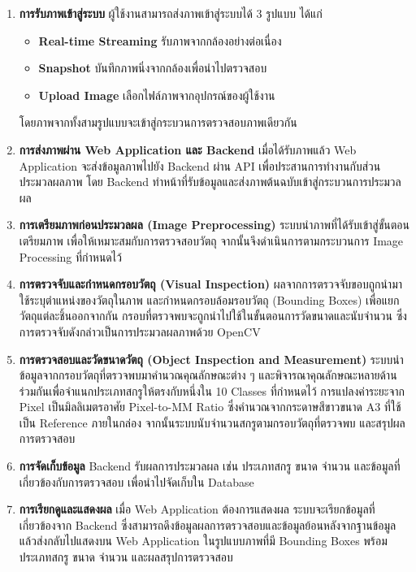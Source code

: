 \begin{enumerate}
    \item \textbf{การรับภาพเข้าสู่ระบบ} 
    ผู้ใช้งานสามารถส่งภาพเข้าสู่ระบบได้ 3 รูปแบบ ได้แก่ 
    \begin{itemize}
      \item \textbf{Real-time Streaming} รับภาพจากกล้องอย่างต่อเนื่อง
      \item \textbf{Snapshot} บันทึกภาพนิ่งจากกล้องเพื่อนำไปตรวจสอบ
      \item \textbf{Upload Image} เลือกไฟล์ภาพจากอุปกรณ์ของผู้ใช้งาน
    \end{itemize}
    โดยภาพจากทั้งสามรูปแบบจะเข้าสู่กระบวนการตรวจสอบภาพเดียวกัน

    \item \textbf{การส่งภาพผ่าน Web Application และ Backend} เมื่อได้รับภาพแล้ว Web Application จะส่งข้อมูลภาพไปยัง Backend ผ่าน API เพื่อประสานการทำงานกับส่วนประมวลผลภาพ โดย Backend ทำหน้าที่รับข้อมูลและส่งภาพต้นฉบับเข้าสู่กระบวนการประมวลผล

    \item \textbf{การเตรียมภาพก่อนประมวลผล (Image Preprocessing)} ระบบนำภาพที่ได้รับเข้าสู่ขั้นตอนเตรียมภาพ เพื่อให้เหมาะสมกับการตรวจสอบวัตถุ จากนั้นจึงดำเนินการตามกระบวนการ Image Processing ที่กำหนดไว้

    \item \textbf{การตรวจจับและกำหนดกรอบวัตถุ (Visual Inspection)} ผลจากการตรวจจับขอบถูกนำมาใช้ระบุตำแหน่งของวัตถุในภาพ และกำหนดกรอบล้อมรอบวัตถุ (Bounding Boxes) เพื่อแยกวัตถุแต่ละชิ้นออกจากกัน กรอบที่ตรวจพบจะถูกนำไปใช้ในขั้นตอนการวัดขนาดและนับจำนวน ซึ่งการตรวจจับดังกล่าวเป็นการประมวลผลภาพด้วย OpenCV

    \item \textbf{การตรวจสอบและวัดขนาดวัตถุ (Object Inspection and Measurement)} ระบบนำข้อมูลจากกรอบวัตถุที่ตรวจพบมาคำนวณคุณลักษณะต่าง ๆ และพิจารณาคุณลักษณะหลายด้านร่วมกันเพื่อจำแนกประเภทสกรูให้ตรงกับหนึ่งใน 10 Classes ที่กำหนดไว้ การแปลงค่าระยะจาก Pixel เป็นมิลลิเมตรอาศัย Pixel-to-MM Ratio ซึ่งคำนวณจากกระดาษสีขาวขนาด A3 ที่ใช้เป็น Reference ภายในกล่อง จากนั้นระบบนับจำนวนสกรูตามกรอบวัตถุที่ตรวจพบ และสรุปผลการตรวจสอบ

    \item \textbf{การจัดเก็บข้อมูล} Backend รับผลการประมวลผล เช่น ประเภทสกรู ขนาด จำนวน และข้อมูลที่เกี่ยวข้องกับการตรวจสอบ เพื่อนำไปจัดเก็บใน Database

    \item \textbf{การเรียกดูและแสดงผล} เมื่อ Web Application ต้องการแสดงผล ระบบจะเรียกข้อมูลที่เกี่ยวข้องจาก Backend ซึ่งสามารถดึงข้อมูลผลการตรวจสอบและข้อมูลย้อนหลังจากฐานข้อมูล แล้วส่งกลับไปแสดงบน Web Application ในรูปแบบภาพที่มี Bounding Boxes พร้อมประเภทสกรู ขนาด จำนวน และผลสรุปการตรวจสอบ
\end{enumerate}


